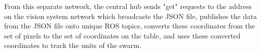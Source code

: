 \documentclass{article}
\begin{document}
     \par From this separate network, the central hub sends "get" requests to the address on the vision system network which broadcasts the JSON file, publishes the data from the JSON file onto unique ROS topics, converts these coordinates from the set of pixels to the set of coordinates on the table, and uses these converted coordinates to track the units of the swarm.
\end{document}
